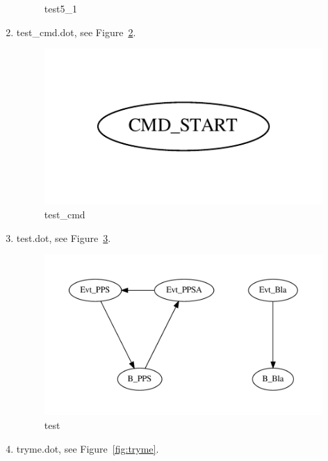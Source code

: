 \documentclass[12pt,a4paper]{report}
\begin{document}
\begin{enumerate}
\begin{figure}
        \caption{test5\_1}
        \label{fig:test5_1}
    \end{figure}
\item test\_cmd.dot, see Figure~\ref{fig:test_cmd}.
    \begin{figure}
        \centering 
        \includegraphics{TestPattern/test_cmd.pdf}
        \caption{test\_cmd}
        \label{fig:test_cmd}
    \end{figure}
\item test.dot, see Figure~\ref{fig:test}.
    \begin{figure}
        \centering 
        \includegraphics*[width=1.0\textwidth,keepaspectratio]{TestPattern/test.pdf}
        \caption{test}
        \label{fig:test}
    \end{figure}
\item tryme.dot, see Figure~\ref{fig:tryme}.
    \begin{figure}
        \centering 

\end{figure}
\end{enumerate}
\end{document}
